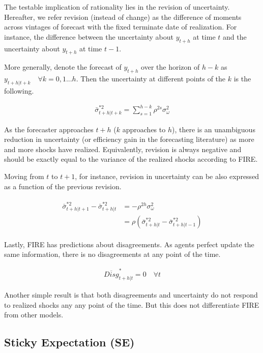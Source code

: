\documentclass[12pt]{article}
\begin{document}
	The testable implication of rationality lies in the revision of uncertainty. Hereafter, we refer revision (instead of change) as the difference of moments across vintages of forecast with the fixed terminate date of realization. For instance, the difference between the uncertainty about $y_{t+h}$ at time $t$ and the uncertainty about $y_{t+h}$ at time $t-1$.
	
	More generally,  denote the forecast of $y_{t+h}$ over the horizon of $h-k$ as $y_{t+h|t+k} \quad \forall k =0,1...h$. Then the uncertainty at different points of the $k$ is the following. 
	
	\begin{eqnarray}\label{VarREPop}
		\bar \sigma^{*2}_{t+h|t+k} = \sum^{h-k}_{s=1}\rho^{2s} \sigma^2_{\omega}
	\end{eqnarray}
	
	As the forecaster approaches $t+h$ ($k$ approaches to $h$), there is an unambiguous reduction in uncertainty (or efficiency gain in the forecasting literature) as more and more shocks have realized. Equivalently, revision is always negative and should be exactly equal to the variance of the realized shocks according to FIRE. 
	
	Moving from $t$ to $t+1$, for instance, revision in uncertainty can be also expressed as a function of the previous revision.  
	
	\begin{eqnarray}\label{VarREPopRv}
		\begin{aligned}
			\bar \sigma^{*2}_{t+h|t+1} - \bar \sigma^{*2}_{t+h|t} & = - \rho^{2h}\sigma^2_\omega \\
			& =  \rho (\bar \sigma^{*2}_{t+h|t} - \bar \sigma^{*2}_{t+h|t-1})
		\end{aligned}
	\end{eqnarray}
	
	Lastly, FIRE has predictions about disagreements. As agents perfect update the same information, there is no disagreements at any point of the time. 
	
	\begin{eqnarray}\label{DisgREPop}
		\overline{Disg}^{*}_{t+h|t}=0 \quad \forall t
	\end{eqnarray}
	
	Another simple result is that both disagreements and uncertainty do not respond to realized shocks any any point of the time. But this does not differentiate FIRE from other models. 
	
	\subsection{Sticky Expectation (SE)}
	
\end{document}
